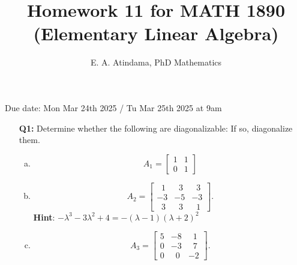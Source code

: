 \documentclass[a4paper,11pt,reqno]{amsart}
\title[MATH 1890 (Elementary Linear Algebra)]{Homework 11 for MATH 1890 (Elementary Linear Algebra)}
\author[Emmanuel Atindama]{E. A. Atindama, PhD Mathematics}
\numberwithin{equation}{section}
\begin{document}
\maketitle
Due date: Mon Mar 24th 2025 / Tu Mar 25th 2025 at 9am
\vspace{0.5cm}

\begin{enumerate}
    \item[\textbf{Q1:}] 
    Determine whether the following are diagonalizable: If so, diagonalize them.
    \begin{enumerate}[a)]
        \item \[A_1 =\begin{bmatrix} 1 & 1\\ 0 & 1 \end{bmatrix}\]

        \item \[ A_2 = \begin{bmatrix}
            \;\;1 & \;\;3 &\;\; 3 \\
            -3 & -5 & -3 \\
            \;\;3 & \;\;3 & \;\;1
            \end{bmatrix}.\]
            \textbf{Hint}:  \( -\lambda^3 -3\lambda^2 + 4 = -(\lambda-1)(\lambda+2)^2\)
    
        \item \[A_3 = \begin{bmatrix}
            5 & -8 &\;\; 1 \\
            0 & -3 & \;\;7 \\
            0 & \;\;0 & -2
    \end{bmatrix}.\] 
    \end{enumerate}
    \begin{center}\setlength{\fboxsep}{10pt}
\end{center}
\end{enumerate}
\end{document}
